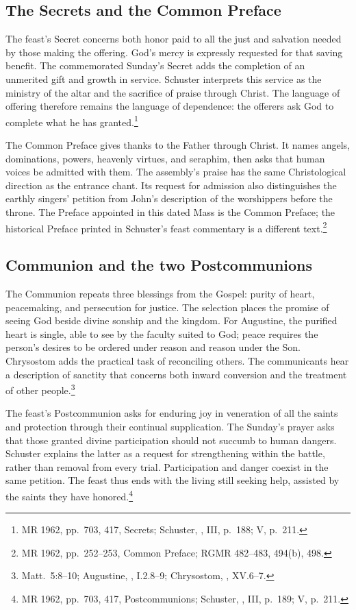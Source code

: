 \subsection{The Secrets and the Common Preface}
The feast's Secret concerns both honor paid to all the just and salvation
needed by those making the offering. God's mercy is expressly requested for
that saving benefit. The commemorated Sunday's Secret adds the completion
of an unmerited gift and growth in service. Schuster interprets this service
as the ministry of the altar and the sacrifice of praise through Christ.
The language of offering therefore remains the language of dependence:
the offerers ask God to complete what he has granted.\footnote{MR 1962,
pp.~703, 417, Secrets; Schuster, , III, p.~188;
V, p.~211.}

The Common Preface gives thanks to the Father through Christ. It names
angels, dominations, powers, heavenly virtues, and seraphim, then asks that
human voices be admitted with them. The assembly's praise has the same
Christological direction as the entrance chant. Its request for admission
also distinguishes the earthly singers' petition from John's description
of the worshippers before the throne. The Preface appointed in this dated
Mass is the Common Preface; the historical Preface printed in Schuster's
feast commentary is a different text.\footnote{MR 1962, pp.~252--253,
Common Preface; RGMR 482--483, 494(b), 498.}

\subsection{Communion and the two Postcommunions}
The Communion repeats three blessings from the Gospel: purity of heart,
peacemaking, and persecution for justice. The selection places the promise
of seeing God beside divine sonship and the kingdom. For Augustine, the
purified heart is single, able to see by the faculty suited to God; peace
requires the person's desires to be ordered under reason and reason under
the Son. Chrysostom adds the practical task of reconciling others.
The communicants hear a description of sanctity that concerns both inward
conversion and the treatment of other people.\footnote{Matt.~5:8--10;
Augustine, , I.2.8--9;
Chrysostom, , XV.6--7.}

The feast's Postcommunion asks for enduring joy in veneration of all the
saints and protection through their continual supplication. The Sunday's
prayer asks that those granted divine participation should not succumb to
human dangers. Schuster explains the latter as a request for strengthening
within the battle, rather than removal from every trial. Participation
and danger coexist in the same petition. The feast thus ends with the living
still seeking help, assisted by the saints they have honored.\footnote{
MR 1962, pp.~703, 417, Postcommunions; Schuster, ,
III, p.~189; V, p.~211.}
